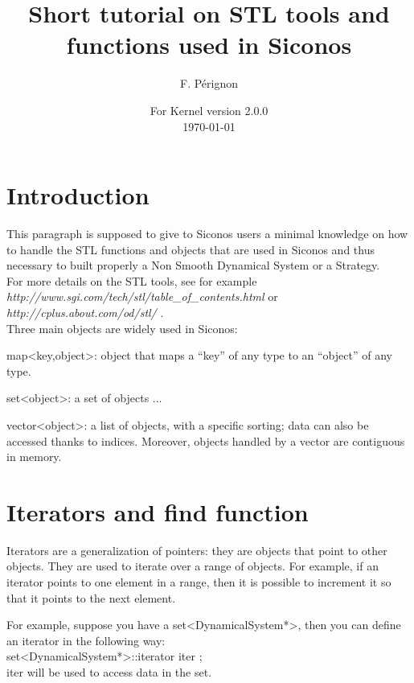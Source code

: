 \documentclass[10pt]{article}
\begin{document}
\thispagestyle{empty}
\title{Short tutorial on STL tools and functions used in Siconos}
\author{F. P\'erignon}

\date{For Kernel version 2.0.0 \\
 \today}
\maketitle

\pagestyle{fancy}

\section{Introduction}
This paragraph is supposed to give to Siconos users a minimal knowledge on how to handle the STL functions and objects that are used in Siconos and thus necessary
to built properly a Non Smooth Dynamical System or a Strategy. \\
For more details on the STL tools, see for example \textit{http://www.sgi.com/tech/stl/table\_of\_contents.html} or \textit{ http://cplus.about.com/od/stl/ }. \\
Three main objects are widely used in Siconos:
\bei
\item map<key,object>: object that maps a ``key'' of any type to an ``object'' of any type. 
\item set<object>: a set of objects ...
\item vector<object>: a list of objects, with a specific sorting; data can also be accessed thanks to indices. Moreover, objects handled by a vector are contiguous in memory.
\ei

\section{Iterators and find function}\label{ItAndFind}

Iterators are a generalization of pointers: they are objects that point to other objects. They are used to iterate over a range of objects.
For example, if an iterator points to one element in a range, then it is possible to increment it so that it points to the next element. 

For example, suppose you have a set<DynamicalSystem*>, then you can define an iterator in the following way: \\
set<DynamicalSystem*>::iterator iter ; \\
iter will be used to access data in the set. \\
\end{document}

